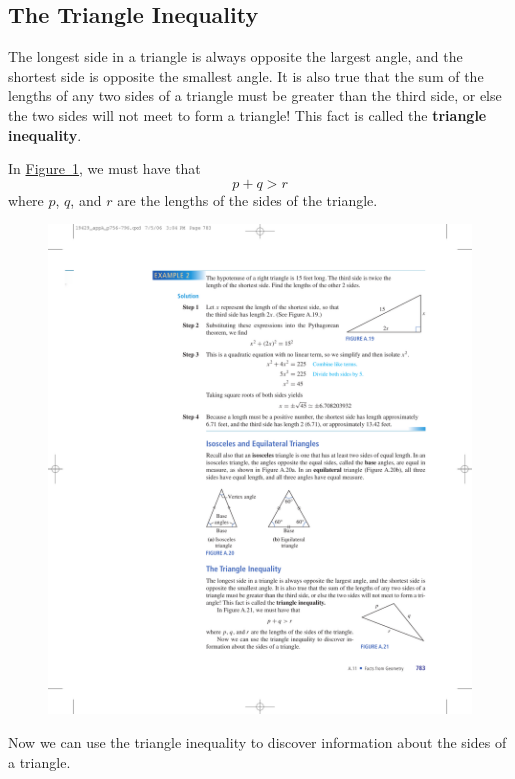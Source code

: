 \documentclass[10pt,]{book}
\newcommand{\terminology}[1]{\textbf{#1}}
\theoremstyle{plain}
\theoremstyle{definition}
\theoremstyle{definition}
\theoremstyle{definition}
\numberwithin{equation}{part}
\newcommand{\gt}{>}
\begin{document}
\subsection[{The Triangle Inequality}]{The Triangle Inequality}\label{subsection-53}
The longest side in a triangle is always opposite the largest angle, and the shortest side is opposite the smallest angle. It is also true that the sum of the lengths of any two sides of a triangle must be greater than the third side, or else the two sides will not meet to form a triangle! This fact is called the \terminology{triangle inequality}.%
\par
In \hyperref[fig-oblique-triangle]{Figure~\ref{fig-oblique-triangle}}, we must have that%
\begin{equation*}
p + q \gt r
\end{equation*}
where \(p\), \(q\), and \(r\) are the lengths of the sides of the triangle. \leavevmode%
\begin{figure}
\centering
\includegraphics[width=0.35\linewidth]{images/fig-oblique-triangle}
\caption{\label{fig-oblique-triangle}}
\end{figure}
%
\par
Now we can use the triangle inequality to discover information about the sides of a triangle.%
\end{document}
